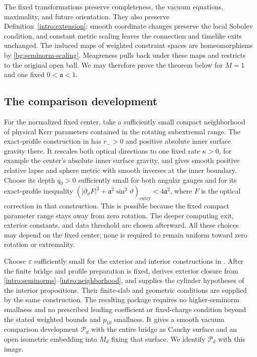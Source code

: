The fixed transformations preserve completeness, the vacuum equations,
maximality, and future orientation. They also preserve
Definition~\ref{intro:extension}: smooth coordinate changes preserve
the local Sobolev condition, and constant metric scaling leaves the
connection and timelike exits unchanged. The induced maps of weighted
constraint spaces are homeomorphisms by \eqref{bg:seminorm-scaling}.
Meagreness pulls back under these maps and restricts to the original
open ball. We may therefore prove the theorem below for $M=1$ and one
fixed $0<\mathfrak a<1$.

\subsection{The comparison development}

For the normalized fixed center, take a sufficiently
small compact neighborhood of physical Kerr parameters contained in the
rotating subextremal range. The exact-profile construction in
\cite[Section~7.1]{KerrCTwo} has $r_->0$ and positive absolute inner surface
gravity there. It rescales both optical directions to one fixed rate
$\kappa>0$, for example the center's absolute inner surface gravity, and
gives smooth positive relative lapse and sphere metric with smooth inverses
at the inner boundary. Choose its depth $q_0>0$ sufficiently small for both
angular gauges and for its exact-profile inequality
$(|\partial_\vartheta F|^2+\mathfrak a^2\sin^2\vartheta)_{\mathrm{entry}}
<4\mathfrak a^2$, where $F$ is the optical correction in that construction.
This is possible because the fixed
compact parameter range stays away from zero rotation. The deeper computing
exit, exterior constants, and data threshold are chosen afterward. All these
choices may depend on the fixed center; none is required to remain uniform
toward zero rotation or extremality.

Choose $\varepsilon$ sufficiently small for the exterior and interior
constructions in \cite[, , , , , , ]{KerrCTwo}.
After the finite bridge and profile preparation is fixed,
 derives exterior closure from
\eqref{intro:seminorms}--\eqref{intro:neighborhood}, and
 supplies the cylinder hypotheses
of the interior propositions. Their finite-slab and geometric
conditions are supplied by the same construction. The resulting
package requires no higher-seminorm smallness and no prescribed leading
coefficient or fixed-charge condition beyond the stated weighted bounds
and $p_{10}$ smallness. It gives a smooth vacuum comparison development
$\mathcal P_d$ with the entire bridge as Cauchy surface and an
open isometric embedding into $M_d$ fixing that surface. We
identify $\mathcal P_d$ with this image.

